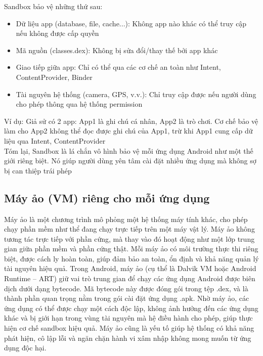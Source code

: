 \newpage
    Sandbox bảo vệ những thứ sau:
      \setlength{\leftmargini}{1.5cm}
      \begin{itemize}
          \item Dữ liệu app (database, file, cache...): Không app nào khác có thể truy cập nếu không được cấp quyền
            \item Mã nguồn (classes.dex): Không bị sửa đổi/thay thế bởi app khác
            \item Giao tiếp giữa app: Chỉ có thể qua các cơ chế an toàn như Intent, ContentProvider, Binder
            \item Tài nguyên hệ thống (camera, GPS, v.v.): Chỉ truy cập được nếu người dùng cho phép thông qua hệ thống permission
        \end{itemize}
        \hspace*{0.8cm}Ví dụ: Giả sử có 2 app:
        App1 là ghi chú cá nhân,
        App2 là trò chơi.
        Cơ chế bảo vệ làm cho App2 không thể đọc được ghi chú của App1, trừ khi App1 cung cấp dữ liệu qua Intent, ContentProvider\\
        \hspace*{0.8cm}Tóm lại, Sandbox là lá chắn vô hình bảo vệ mỗi ứng dụng Android như một thế giới riêng biệt. Nó giúp người dùng yên tâm cài đặt nhiều ứng dụng mà không sợ bị can thiệp trái phép

\subsection{Máy ảo (VM) riêng cho mỗi ứng dụng}

  \hspace*{0.8cm}Máy ảo là một chương trình mô phỏng một hệ thống máy tính khác, cho phép chạy phần mềm như thể đang chạy trực tiếp trên một máy vật lý. Máy ảo không tương tác trực tiếp với phần cứng, mà thay vào đó hoạt động như một lớp trung gian giữa phần mềm và phần cứng thật. Mỗi máy ảo có môi trường thực thi riêng biệt, được cách ly hoàn toàn, giúp đảm bảo an toàn, ổn định và khả năng quản lý tài nguyên hiệu quả. Trong Android, máy ảo (cụ thể là Dalvik VM hoặc Android Runtime – ART) giữ vai trò trung gian để chạy các ứng dụng Android được biên dịch dưới dạng bytecode. Mã bytecode này được đóng gói trong tệp .dex, và là thành phần quan trọng nằm trong gói cài đặt ứng dụng .apk. Nhờ máy ảo, các ứng dụng có thể được chạy một cách độc lập, không ảnh hưởng đến các ứng dụng khác và bị giới hạn trong vùng tài nguyên mà hệ điều hành cho phép, giúp thực hiện cơ chế sandbox hiệu quả. Máy ảo cũng là yếu tố giúp hệ thống có khả năng phát hiện, cô lập lỗi và ngăn chặn hành vi xâm nhập không mong muốn từ ứng dụng độc hại.

